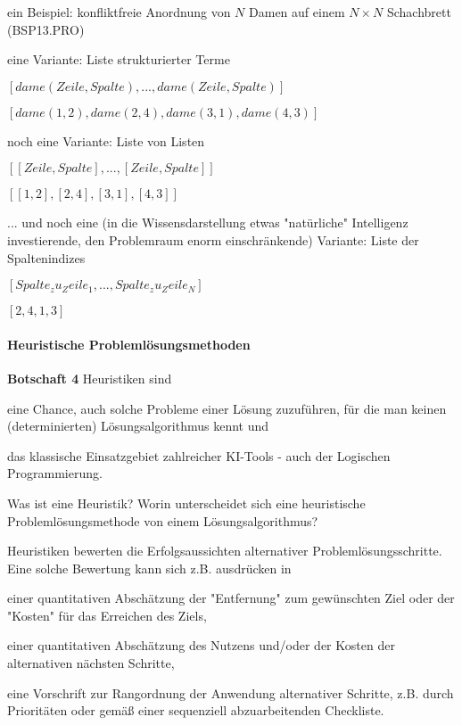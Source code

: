 \documentclass[a4paper]{article}
\renewcommand{\note}[2]{\begin{noteBox} \textbf{#1} #2 \end{noteBox}}
\begin{document}
\begin{multicols}{3}
  ein Beispiel: konfliktfreie Anordnung von $N$ Damen auf einem $N\times N$ Schachbrett (BSP13.PRO)
  \begin{itemize*}
    \item eine Variante: Liste strukturierter Terme
    \begin{itemize*}
      \item $[dame(Zeile,Spalte),...,dame(Zeile,Spalte)]$
      \item $[dame(1,2), dame(2,4), dame(3,1), dame(4,3) ]$
    \end{itemize*}
    \item noch eine Variante: Liste von Listen
    \begin{itemize*}
      \item $[[Zeile, Spalte] , ... , [Zeile,Spalte] ]$
      \item $[ [1,2] , [2,4] , [3,1] , [4,3] ]$
    \end{itemize*}
    \item ... und noch eine (in die Wissensdarstellung etwas "natürliche" Intelligenz investierende, den Problemraum enorm einschränkende) Variante: Liste der Spaltenindizes
    \begin{itemize*}
      \item $[ Spalte_zu_Zeile_1, ..., Spalte_zu_Zeile_N ]$
      \item $[ 2, 4, 1, 3 ]$
    \end{itemize*}
  \end{itemize*}

  \paragraph{Heuristische Problemlösungsmethoden}
  \note{Botschaft  4}{Heuristiken sind
    \begin{enumerate*}
      \item eine Chance, auch solche Probleme einer Lösung zuzuführen, für die man keinen (determinierten) Lösungsalgorithmus kennt und
      \item das klassische Einsatzgebiet zahlreicher KI-Tools - auch der Logischen Programmierung.
    \end{enumerate*}
  }

  Was ist eine Heuristik? Worin unterscheidet sich eine heuristische Problemlösungsmethode von einem Lösungsalgorithmus?

  Heuristiken bewerten die Erfolgsaussichten alternativer Problemlösungsschritte. Eine solche Bewertung kann sich z.B. ausdrücken in
  \begin{itemize*}
    \item einer quantitativen Abschätzung der "Entfernung" zum gewünschten Ziel oder der "Kosten" für das Erreichen des Ziels,
    \item einer quantitativen Abschätzung des Nutzens und/oder der Kosten der alternativen nächsten Schritte,
    \item eine Vorschrift zur Rangordnung der Anwendung alternativer Schritte, z.B. durch Prioritäten oder gemäß einer sequenziell abzuarbeitenden Checkliste.
  \end{itemize*}


\end{multicols}
\end{document}

